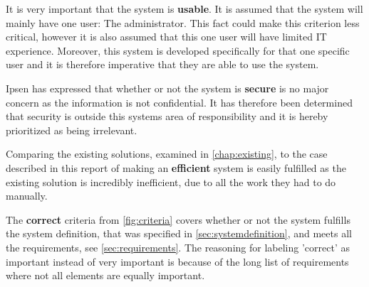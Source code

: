 It is very important that the system is \textbf{usable}.
It is assumed that the system will mainly have one user: The administrator. %
This fact could make this criterion less critical, however it is also assumed that this one user will have limited IT experience.
Moreover, this system is developed specifically for that one specific user and it is therefore imperative that they are able to use the system. %

Ipsen has expressed that whether or not the system is \textbf{secure} is no major concern as the information is not confidential.
It has therefore been determined that security is outside this systems area of responsibility and it is hereby prioritized as being irrelevant.

Comparing the existing solutions, examined in \cref{chap:existing}, to the case described in this report of making an \textbf{efficient} system is easily fulfilled as the existing solution is incredibly inefficient, due to all the work they had to do manually.

The \textbf{correct} criteria from \cref{fig:criteria} covers whether or not the system fulfills the system definition, that was specified in \cref{sec:systemdefinition}, and meets all the requirements, see \cref{sec:requirements}.
The reasoning for labeling 'correct' as important instead of very important is because of the long list of requirements where not all elements are equally important.

